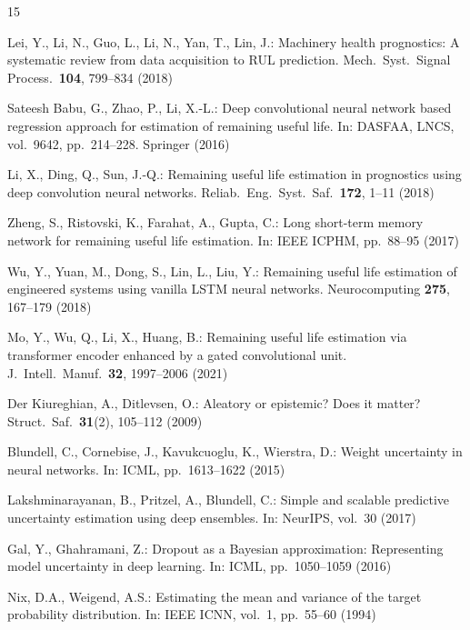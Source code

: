 \documentclass[runningheads]{llncs}
\begin{document}
\begin{thebibliography}{15}

Lei, Y., Li, N., Guo, L., Li, N., Yan, T., Lin, J.:
Machinery health prognostics: A systematic review from data acquisition to RUL prediction.
Mech.\ Syst.\ Signal Process.\ \textbf{104}, 799--834 (2018)

Sateesh Babu, G., Zhao, P., Li, X.-L.:
Deep convolutional neural network based regression approach for estimation of remaining useful life.
In: DASFAA, LNCS, vol.~9642, pp.~214--228. Springer (2016)

Li, X., Ding, Q., Sun, J.-Q.:
Remaining useful life estimation in prognostics using deep convolution neural networks.
Reliab.\ Eng.\ Syst.\ Saf.\ \textbf{172}, 1--11 (2018)

Zheng, S., Ristovski, K., Farahat, A., Gupta, C.:
Long short-term memory network for remaining useful life estimation.
In: IEEE ICPHM, pp.~88--95 (2017)

Wu, Y., Yuan, M., Dong, S., Lin, L., Liu, Y.:
Remaining useful life estimation of engineered systems using vanilla LSTM neural networks.
Neurocomputing \textbf{275}, 167--179 (2018)

Mo, Y., Wu, Q., Li, X., Huang, B.:
Remaining useful life estimation via transformer encoder enhanced by a gated convolutional unit.
J.\ Intell.\ Manuf.\ \textbf{32}, 1997--2006 (2021)

Der Kiureghian, A., Ditlevsen, O.:
Aleatory or epistemic? Does it matter?
Struct.\ Saf.\ \textbf{31}(2), 105--112 (2009)

Blundell, C., Cornebise, J., Kavukcuoglu, K., Wierstra, D.:
Weight uncertainty in neural networks.
In: ICML, pp.~1613--1622 (2015)

Lakshminarayanan, B., Pritzel, A., Blundell, C.:
Simple and scalable predictive uncertainty estimation using deep ensembles.
In: NeurIPS, vol.~30 (2017)

Gal, Y., Ghahramani, Z.:
Dropout as a Bayesian approximation: Representing model uncertainty in deep learning.
In: ICML, pp.~1050--1059 (2016)

Nix, D.A., Weigend, A.S.:
Estimating the mean and variance of the target probability distribution.
In: IEEE ICNN, vol.~1, pp.~55--60 (1994)


\end{thebibliography}
\end{document}
